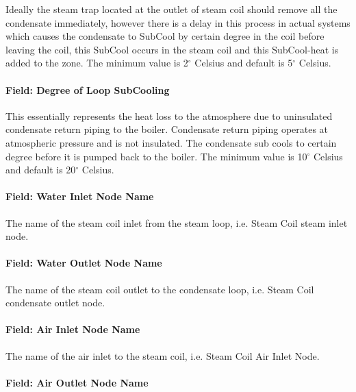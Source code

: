 Ideally the steam trap located at the outlet of steam coil should remove all the condensate immediately, however there is a delay in this process in actual systems which causes the condensate to SubCool by certain degree in the coil before leaving the coil, this SubCool occurs in the steam coil and this SubCool-heat is added to the zone. The minimum value is 2$^\circ$ Celsius and default is 5$^\circ$ Celsius.

\paragraph{Field: Degree of Loop SubCooling}\label{field-degree-of-loop-subcooling}

This essentially represents the heat loss to the atmosphere due to uninsulated condensate return piping to the boiler. Condensate return piping operates at atmospheric pressure and is not insulated. The condensate sub cools to certain degree before it is pumped back to the boiler. The minimum value is 10$^\circ$ Celsius and default is 20$^\circ$ Celsius.

\paragraph{Field: Water Inlet Node Name}\label{field-water-inlet-node-name-2-000}

The name of the steam coil inlet from the steam loop, i.e. Steam Coil steam inlet node.

\paragraph{Field: Water Outlet Node Name}\label{field-water-outlet-node-name-2-000}

The name of the steam coil outlet to the condensate loop, i.e. Steam Coil condensate outlet node.

\paragraph{Field: Air Inlet Node Name}\label{field-air-inlet-node-name-2-001}

The name of the air inlet to the steam coil, i.e. Steam Coil Air Inlet Node.

\paragraph{Field: Air Outlet Node Name}\label{field-air-outlet-node-name-2-001}

